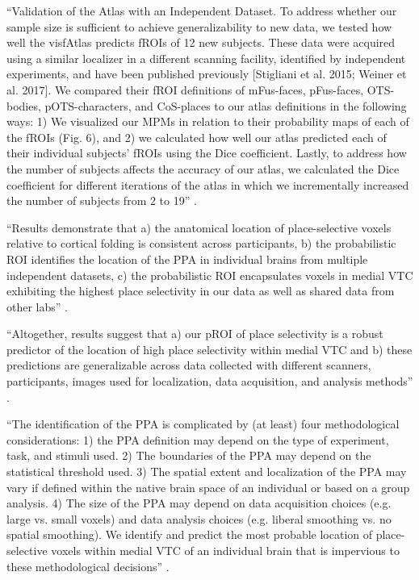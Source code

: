 ``Validation of the Atlas with an Independent Dataset.
%
To address whether our sample size is sufficient to achieve generalizability to
new data, we tested how well the visfAtlas predicts fROIs of 12 new subjects.
%
These data were acquired using a similar localizer in a different scanning
facility, identified by independent experiments, and have been published
previously [Stigliani et al.  2015; Weiner et al. 2017].
%
We compared their fROI definitions of mFus-faces, pFus-faces, OTS-bodies,
pOTS-characters, and CoS-places to our atlas definitions in the following
ways:
%
1) We visualized our MPMs in relation to their probability maps of
each of the fROIs (Fig. 6), and
%
2) we calculated how well our atlas predicted each of their individual
subjects' fROIs using the Dice coefficient.
%
Lastly, to address how the number of subjects affects the accuracy of our
atlas, we calculated the Dice coefficient for different iterations of the
atlas in which we incrementally increased the number of subjects from 2 to
19'' \citep{rosenke2021probabilistic}.



``Results demonstrate that
%
a) the anatomical location of place-selective voxels relative to cortical
folding is consistent across participants,
%
b) the probabilistic ROI identifies the location of the PPA in individual brains
from multiple independent datasets,
%
c) the probabilistic ROI encapsulates voxels in medial VTC exhibiting the
highest place selectivity in our data as well as shared data from other labs''
\citep{weiner2018defining}.

``Altogether, results suggest that
%
a) our pROI of place selectivity is a robust predictor of the location of high
place selectivity within medial VTC and
%
b) these predictions are generalizable across data collected with different
scanners, participants, images used for localization, data acquisition, and
analysis methods'' \citep{weiner2018defining}.



``The identification of the PPA is complicated by (at least) four methodological
considerations:
%
1) the PPA definition may depend on the type of experiment, task, and stimuli
used.
%
2) The boundaries of the PPA may depend on the statistical threshold used.
%
3) The spatial extent and localization of the PPA may vary if defined within the
native brain space of an individual or based on a group analysis.
%
4) The size of the PPA may depend on data acquisition choices (e.g. large vs.
small voxels) and data analysis choices (e.g. liberal smoothing vs. no spatial
smoothing).
%
We identify and predict the most probable location of place-selective voxels
within medial VTC of an individual brain that is impervious to these
methodological decisions'' \citep{weiner2018defining}.



